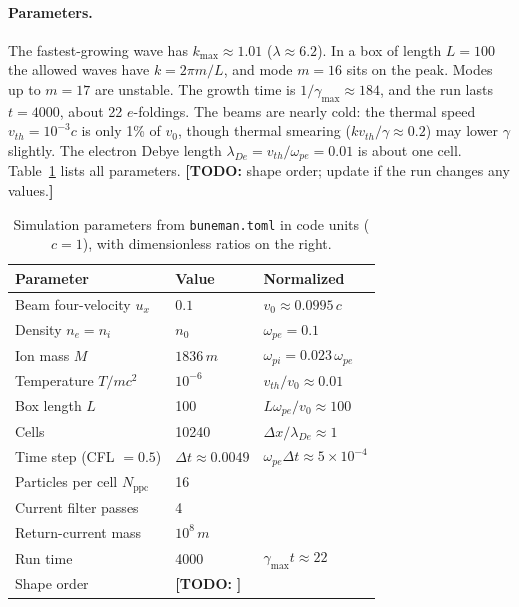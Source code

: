 \documentclass[10pt,twocolumn,letterpaper]{article}
\newcommand{\wpe}{\omega_{pe}}        %
\newcommand{\wpi}{\omega_{pi}}        %
\newcommand{\vz}{v_0}                 %
\newcommand{\ppc}{N_\mathrm{ppc}}     %
\newif\ifdraft \drafttrue
\newcommand{\todo}[1]{\ifdraft{\color{red}\textbf{[TODO:} #1\textbf{]}}\fi}
\begin{document}
\paragraph{Parameters.}
The fastest-growing wave has $k_{\max}\approx1.01$ ($\lambda\approx6.2$). In a box of length
$L=100$ the allowed waves have $k=2\pi m/L$, and mode $m=16$ sits on the peak. Modes up to
$m=17$ are unstable. The growth time is $1/\gamma_{\max}\approx184$, and the run lasts
$t=4000$, about 22 $e$-foldings. The beams are nearly cold: the thermal speed
$v_{th}=10^{-3}c$ is only 1\% of $\vz$, though thermal smearing ($k v_{th}/\gamma\approx0.2$)
may lower $\gamma$ slightly. The electron Debye length $\lambda_{De}=v_{th}/\wpe=0.01$ is about
one cell. Table~\ref{tab:params} lists all parameters.
\todo{shape order; update if the run changes any values.}

\begin{table}[t]
  \centering
  \caption{Simulation parameters from \texttt{buneman.toml} in code units ($c=1$), with
  dimensionless ratios on the right.}
  \label{tab:params}
  \small
  \begin{tabular}{@{}lll@{}}
    \toprule
    Parameter & Value & Normalized \\
    \midrule
    Beam four-velocity $u_x$            & $0.1$               & $\vz\approx0.0995\,c$ \\
    Density $n_e=n_i$                   & $n_0$               & $\wpe=0.1$ \\
    Ion mass $M$                        & $1836\,m$           & $\wpi=0.023\,\wpe$ \\
    Temperature $T/mc^2$               & $10^{-6}$           & $v_{th}/\vz\approx0.01$ \\
    Box length $L$                      & 100                 & $L\wpe/\vz\approx100$ \\
    Cells                               & 10240               & $\Delta x/\lambda_{De}\approx1$ \\
    Time step (CFL $=0.5$)              & $\Delta t\approx0.0049$ & $\wpe\Delta t\approx5\times10^{-4}$ \\
    Particles per cell $\ppc$           & 16                  & \\
    Current filter passes               & 4                   & \\
    Return-current mass                 & $10^8\,m$           & \\
    Run time                            & 4000                & $\gamma_{\max}t\approx22$ \\
    Shape order                         & \todo{}             & \\
    \bottomrule
  \end{tabular}
\end{table}
\end{document}
